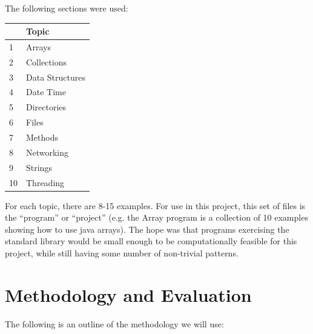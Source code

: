 \documentclass[12pt]{article}
\begin{document}
\noindent The following sections were used:
\begin{table}[ht]
\begin{tabular}{@{}ll@{}}
\toprule
   & Topic           \\ \midrule
1  & Arrays          \\
2  & Collections     \\
3  & Data Structures \\
4  & Date Time       \\
5  & Directories     \\
6  & Files           \\
7  & Methods         \\
8  & Networking      \\
9  & Strings         \\
10 & Threading       \\ \bottomrule
\end{tabular}
\end{table}

\noindent For each topic, there are 8-15 examples. For use in this project, this set of files is the ``program'' or ``project'' (e.g. the Array program is a collection of 10 examples showing how to use java arrays). The hope was that programs exercising the standard library would be small enough to be computationally feasible for this project, while still having some number of non-trivial patterns.

\section{Methodology and Evaluation}
The following is an outline of the methodology we will use:
\end{document}
